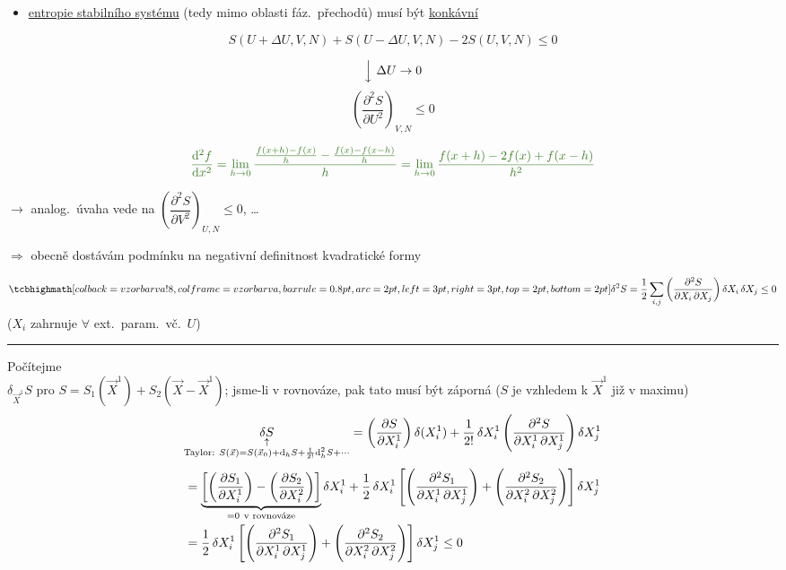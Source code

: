 \begin{itemize}
  \item \underline{entropie stabilního systému} (tedy mimo oblasti fáz.\ přechodů) musí být \underline{konkávní}
\end{itemize}
\[
  S(U+\Delta U,V,N) + S(U-\Delta U,V,N) - 2S(U,V,N) \leq 0
\]
\begin{minipage}{0.4\textwidth}
\[
  \Big\downarrow\ \Delta U\to 0
\]
\[
  \left(\frac{\partial^2S}{\partial U^2}\right)_{V,N} \leq 0
\]
\end{minipage}
\begin{minipage}{0.58\textwidth}

\medskip
\end{minipage}
\[
  \zelene{\frac{\dd^2f}{\dd x^2} = \lim_{h\to0}\frac{\frac{f(x+h)-f(x)}{h} - \frac{f(x)-f(x-h)}{h}}{h} = \lim_{h\to0}\frac{f(x+h) - 2f(x) + f(x-h)}{h^2}}
\]

$\to$ analog.\ úvaha vede na \quad $\left(\dfrac{\partial^2S}{\partial V^2}\right)_{U,N} \leq 0$, \dots \hfill {}

$\Rightarrow$ obecně dostávám podmínku na negativní definitnost kvadratické formy
\begin{veta}
\[
  \vzorec{\delta^2S = \frac12\sum_{i,j}\left(\frac{\partial^2S}{\partial X_i\,\partial X_j}\right)\delta X_i\,\delta X_j \leq 0}
\]
\hfill ($X_i$ zahrnuje $\forall$ ext.\ param.\ vč.\ $U$)
\end{veta}

\noindent\rule{\linewidth}{0.4pt}

Počítejme \\
$\delta_{\vec X^1}S$ pro $S = S_1(\vec X^1) + S_2(\vec X - \vec X^1)$; jsme-li v rovnováze, pak tato  musí být záporná ($S$ je vzhledem k $\vec X^1$ již v maximu)
\[
  \underset{\substack{\uparrow\\ \text{Taylor: } S(\vec x) = S(\vec x_0) + \dd_hS + \frac{1}{2!}\dd_h^2S + \cdots}}{\delta S}
  = \left(\pdv{S}{X_i^1}\right)\delta(X_i^1) + \frac{1}{2!}\,\delta X_i^1\left(\frac{\partial^2S}{\partial X_i^1\,\partial X_j^1}\right)\delta X_j^1
\]
\begin{align*}
  &= \underbrace{\left[\left(\pdv{S_1}{X_i^1}\right) - \left(\pdv{S_2}{X_i^2}\right)\right]}_{=0\ \text{v rovnováze}}\delta X_i^1
   + \frac12\,\delta X_i^1\left[\left(\frac{\partial^2S_1}{\partial X_i^1\,\partial X_j^1}\right) + \left(\frac{\partial^2S_2}{\partial X_i^2\,\partial X_j^2}\right)\right]\delta X_j^1 \\
  &= \frac12\,\delta X_i^1\left[\left(\frac{\partial^2S_1}{\partial X_i^1\,\partial X_j^1}\right) + \left(\frac{\partial^2S_2}{\partial X_i^2\,\partial X_j^2}\right)\right]\delta X_j^1 \leq 0
\end{align*}

